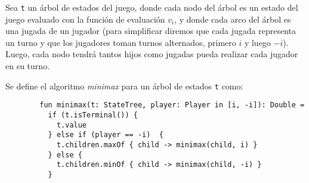     \begin{definition}
      Sea \texttt{t} un árbol de estados del juego, donde cada nodo del árbol es un estado del juego
      evaluado con la función de evaluación \(v_i\), y donde cada arco del árbol es una jugada de un
      jugador (para simplificar diremos que cada jugada representa un turno y que los jugadores 
      toman turnos alternados, primero \(i\) y luego \(-i\)).
      Luego, cada nodo tendrá tantos hijos como jugadas pueda realizar cada jugador en su turno.

      Se define el algoritmo \textit{minimax} para un árbol de estados \texttt{t} como:
      
      \begin{verbatim}
        fun minimax(t: StateTree, player: Player in [i, -i]): Double =
          if (t.isTerminal()) {
            t.value
          } else if (player == -i)  {
            t.children.maxOf { child -> minimax(child, i) }
          } else {
            t.children.minOf { child -> minimax(child, -i) }
          } 
      \end{verbatim}
    \end{definition}